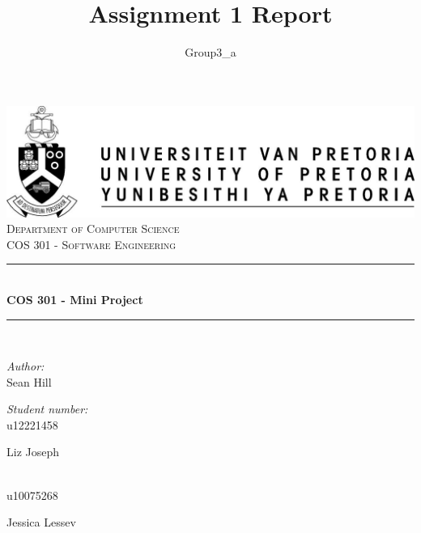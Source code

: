 \documentclass[a4paper,12pt]{report}
\author{Group3_a}
\title{ Assignment 1 Report}
\newcommand{\HRule}{\rule{\linewidth}{0.5mm}}
\begin{document}
\setlength{\parskip}{6pt}

\begin{titlepage}

\begin{center}
\includegraphics[width=1\textwidth]{./up-logo.jpg}\\[0.4cm]    
\textsc{\LARGE Department of Computer Science}\\[1.5cm]
\textsc{\Large COS 301 - Software Engineering}\\[0.5cm]
\HRule \\[0.4cm]
{ \huge \bfseries COS 301 - Mini Project}\\[0.4cm]
\HRule \\[0.4cm]
\begin{minipage}{0.4\textwidth}
\begin{flushleft} \large
\emph{Author:}\\
Sean {Hill}
\end{flushleft}
\end{minipage}
\begin{minipage}{0.4\textwidth}
\begin{flushright} \large
\emph{Student number:} \\
u12221458
\end{flushright}
\end{minipage}
\begin{minipage}{0.4\textwidth}
\begin{flushleft} \large
Liz {Joseph}
\end{flushleft}
\end{minipage}
\begin{minipage}{0.4\textwidth}
\begin{flushright} \large
\emph{} \\
u10075268
\end{flushright}
\end{minipage}
\begin{minipage}{0.4\textwidth}
\begin{flushleft} \large
Jessica {Lessev}
\end{flushleft}

\end{minipage}
\end{center}
\end{titlepage}
\end{document}
